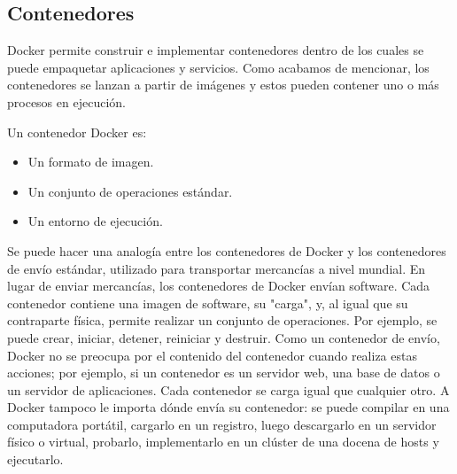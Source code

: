 \subsection{Contenedores}
Docker permite construir e implementar contenedores dentro de los cuales se puede 
empaquetar aplicaciones y servicios. Como acabamos de mencionar, los contenedores 
se lanzan a partir de imágenes y estos pueden contener uno o más procesos en ejecución.

Un contenedor Docker es:
\begin{itemize}
    \item Un formato de imagen.
    \item Un conjunto de operaciones estándar.
    \item Un entorno de ejecución.
\end{itemize}

Se puede hacer una analogía entre los contenedores de Docker y los contenedores 
de envío estándar, utilizado para transportar mercancías a nivel mundial. 
En lugar de enviar mercancías, los contenedores de Docker envían software. 
Cada contenedor contiene una imagen de software, su "carga", y, al igual 
que su contraparte física, permite realizar un conjunto de operaciones. 
Por ejemplo, se puede crear, iniciar, detener, reiniciar y destruir. Como 
un contenedor de envío, Docker no se preocupa por el contenido del contenedor 
cuando realiza estas acciones; por ejemplo, si un contenedor es un servidor web, 
una base de datos o un servidor de aplicaciones. Cada contenedor se carga 
igual que cualquier otro. A Docker tampoco le importa dónde envía su contenedor: 
se puede compilar en una computadora portátil, cargarlo en un registro, luego 
descargarlo en un servidor físico o virtual, probarlo, implementarlo en un 
clúster de una docena de hosts y ejecutarlo. 


